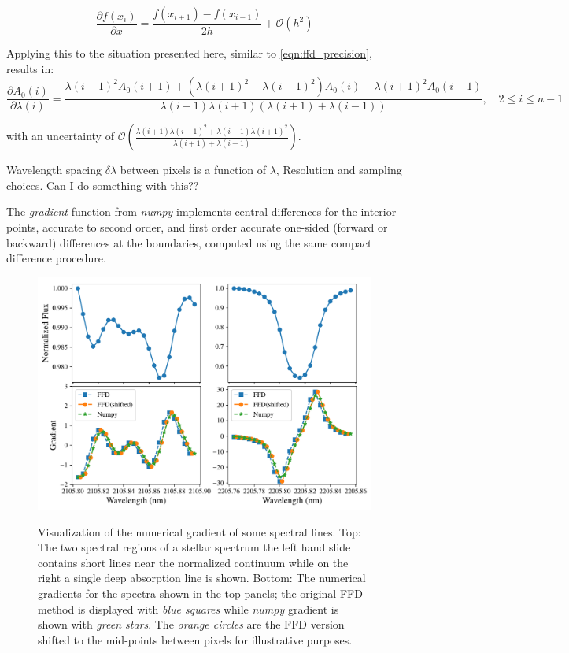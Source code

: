 {\[\frac{\partial{f(x_i)}}{\partial{x}} = \frac{f\left(x_{i+1}\right) - f\left(x_{i-1}\right)}{2h} + \mathcal{O}\left({h}^{2}\right)\]


Applying this to the situation presented here, similar to \cref{eqn:ffd_precision}, results in:
\[\frac{\partial A_0(i)}{\partial\lambda(i)} = \frac{{\lambda(i-1)}^{2} A_0(i+1) + ({\lambda(i+1)}^{2}-{\lambda(i-1)}^{2}) A_0(i) - {\lambda(i+1)}^{2} A_0(i-1)} {\lambda(i-1)\lambda(i+1)(\lambda(i+1) + \lambda(i-1))}, \hspace{1em} 2 \leq i \leq n-1\]

with an uncertainty of \(\mathcal{O}\left(\frac{\lambda(i+1){\lambda(i-1)}^{2} + \lambda(i-1){\lambda(i+1)}^{2}}{\lambda(i+1) + \lambda(i-1)}\right)\).


{\red{} Wavelength spacing \(\delta\lambda\) between pixels is a function of \(\lambda\), Resolution and sampling choices.
Can I do something with this??}

The \emph{gradient} function from \emph{numpy} implements central differences for the interior points, accurate to second order, and first order accurate one-sided (forward or backward) differences at the boundaries, computed using the same compact difference procedure.

\begin{figure}
    \centering
    \includegraphics[width=0.8\linewidth]{figures/information-content/spectral_gradients}\\
    \caption[Comparing of numerical gradient alogithms.]{Visualization of the numerical gradient of some spectral lines.
        Top: The two spectral regions of a stellar spectrum the left hand slide contains short lines near the normalized continuum while on the right a single deep absorption line is shown.
        Bottom: The numerical gradients for the spectra shown in the top panels; the original {FFD} method is displayed with \emph{blue squares} while \emph{numpy} gradient is shown with \emph{green stars}.
        The \emph{orange circles} are the {FFD} version shifted to the mid-points between pixels for illustrative purposes.}
    \label{fig:gradients}
\end{figure}


}
